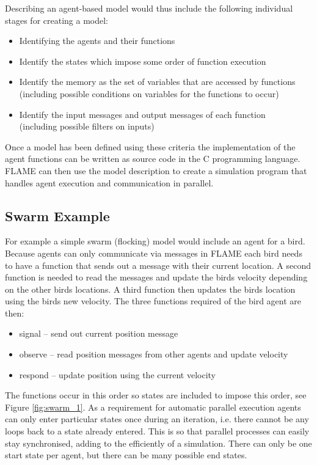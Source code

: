\clearpage

Describing an agent-based model would thus include the following individual
stages for creating a model:

\begin{itemize}
\item Identifying the agents and their functions
\item Identify the states which impose some order of function execution
\item Identify the memory as the set of variables that are accessed by
functions \\(including possible conditions on variables for the functions to
occur)
\item Identify the input messages and output messages of each function 
\\(including possible filters on inputs)

\end{itemize}

Once a model has been defined using these criteria the implementation of the
agent functions can be written as source code in the C programming language.
FLAME can then use the model description to create a simulation program that
handles agent execution and communication in parallel.

\subsection{Swarm Example}

For example a simple swarm (flocking) model would include an agent for a bird.
Because agents can only communicate via messages in FLAME each bird needs to
have a function that sends out a message with their current location. A second
function is needed to read the messages and update the birds velocity depending
on the other birds locations. A third function then updates the birds location
using the birds new velocity. The three functions required of the bird agent are
then:

\begin{itemize}
\item signal -- send out current position message
\item observe -- read position messages from other agents and update velocity
\item respond -- update position using the current velocity
\end{itemize}

The functions occur in this order so states are included to impose this
order, see Figure \ref{fig:swarm_1}. As a requirement for automatic parallel
execution agents can only enter particular states once during an iteration,
i.e. there cannot be any loops back to a state already entered. This is so that
parallel processes can easily stay synchronised, adding to the efficiently of a
simulation. There can only be one start state per agent, but there can be many
possible end states.

